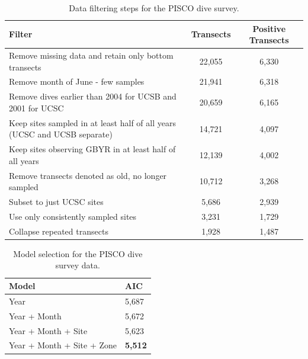 \documentclass[12pt,]{article}
\begin{document}
\begin{table}[ht]
\centering
\caption{Data filtering steps for the PISCO dive survey.} 
\label{tab:Fleet8_Filter}
\begin{tabular}{>{\raggedright}p{4in}cc}
  \hline
Filter & Transects & Positive Transects \\ 
  \hline
Remove missing data and retain only bottom transects & 22,055 & 6,330 \\ 
  Remove month of  June - few samples & 21,941 & 6,318 \\ 
  Remove dives earlier than 2004 for UCSB and 2001 for UCSC & 20,659 & 6,165 \\ 
  Keep sites sampled in at least half of all years (UCSC and UCSB separate) & 14,721 & 4,097 \\ 
  Keep sites observing GBYR in at least half of all years & 12,139 & 4,002 \\ 
  Remove transects denoted as old, no longer sampled & 10,712 & 3,268 \\ 
  Subset to just UCSC sites & 5,686 & 2,939 \\ 
  Use only consistently sampled sites & 3,231 & 1,729 \\ 
  Collapse repeated transects & 1,928 & 1,487 \\ 
   \hline
\end{tabular}
\end{table}\begin{table}[ht]
\centering
\caption{Model selection for the PISCO dive survey data.} 
\label{tab:Fleet8_AIC}
\begin{tabular}{ll}
  \hline
Model & AIC \\ 
  \hline
Year & 5,687 \\ 
  Year + Month & 5,672 \\ 
  Year + Month + Site & 5,623 \\ 
  Year + Month + Site + Zone & \textbf{5,512} \\ 
   \hline
\end{tabular}
\end{table}

\FloatBarrier
\end{document}
